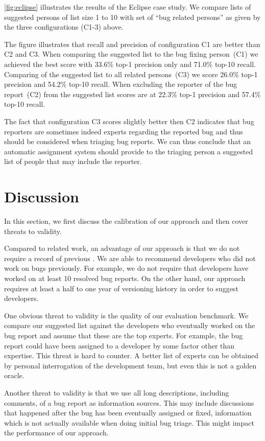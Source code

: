 \autoref{fig:eclipse} illustrates the results of the Eclipse case study. We compare lists of suggested persons of list size 1 to 10 with set of ``bug related persons'' as given by the three configurations (C1-3) above.

The figure illustrates that recall and precision of configuration C1 are better than C2 and C3. When comparing the suggested list to the bug fixing person~(C1) we achieved the best score with 33.6\% top-1 precision only and 71.0\% top-10 recall. Comparing of the suggested list to all related persons~(C3) we score 26.0\% top-1 precision and 54.2\% top-10 recall. When excluding the reporter of the bug report~(C2) from the suggested list scores are at 22.3\% top-1 precision and 57.4\% top-10 recall.

The fact that configuration C3 scores slightly better then C2 indicates that bug reporters are sometimes indeed experts regarding the reported bug and thus should be considered when triaging bug reports. We can thus conclude that an automatic assignment system should provide to the triaging person a suggested list of people that may include the reporter.

\section{Discussion}\label{sec:discussion}

In this section, we first discuss the calibration of our approach and then cover threats to validity.

Compared to related work, an advantage of our approach is that we do not require a record of previous \BRs. We are able to recommend developers who did not work on bugs previously. For example, we do not require that developers have worked on at least 10 resolved bug reports. On the other hand, our approach requires at least a half to one year of versioning history in order to suggest developers. 

One obvious threat to validity is the quality of our evaluation benchmark. We compare our suggested list against the developers who eventually worked on the bug report and assume that these are the top experts. For example, the bug report could have been assigned to a developer by some factor other than expertise. This threat is hard to counter. A better list of experts can be obtained by personal interrogation of the development team, but even this is not a golden oracle.

Another threat to validity is that we use all long descriptions, including comments, of a bug report as information sources. This may include discussions that happened after the bug has been eventually assigned or fixed, information which is not actually available when doing initial bug triage. This might impact the performance of our approach. 


